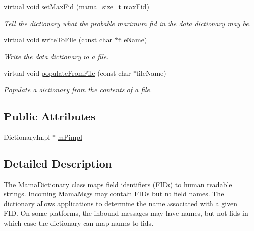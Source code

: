\begin{DoxyCompactItemize}
virtual void \hyperlink{classWombat_1_1MamaDictionary_a9f1d5e3ce24c137751e3451c9511143f}{setMaxFid} (\hyperlink{classmama__size__t}{mama\_\-size\_\-t} maxFid)
\begin{DoxyCompactList}\small\item\em Tell the dictionary what the probable maximum fid in the data dictionary may be. \item\end{DoxyCompactList}\item 
virtual void \hyperlink{classWombat_1_1MamaDictionary_a3f4eac5a4a67b84762f5bc96debeb530}{writeToFile} (const char $\ast$fileName)
\begin{DoxyCompactList}\small\item\em Write the data dictionary to a file. \item\end{DoxyCompactList}\item 
virtual void \hyperlink{classWombat_1_1MamaDictionary_a44e10e3e54d0f58471ec0e457b05442d}{populateFromFile} (const char $\ast$fileName)
\begin{DoxyCompactList}\small\item\em Populate a dictionary from the contents of a file. \item\end{DoxyCompactList}\end{DoxyCompactItemize}
\subsection*{Public Attributes}
\begin{DoxyCompactItemize}
\item 
DictionaryImpl $\ast$ \hyperlink{classWombat_1_1MamaDictionary_a1bf6c56a35c388b96f0943fbe3462364}{mPimpl}
\end{DoxyCompactItemize}


\subsection{Detailed Description}
The {\ttfamily \hyperlink{classWombat_1_1MamaDictionary}{MamaDictionary}} class maps field identifiers (FIDs) to human readable strings. Incoming {\ttfamily \hyperlink{classWombat_1_1MamaMsg}{MamaMsg}}s may contain FIDs but no field names. The dictionary allows applications to determine the name associated with a given FID. On some platforms, the inbound messages may have names, but not fids in which case the dictionary can map names to fids. 

